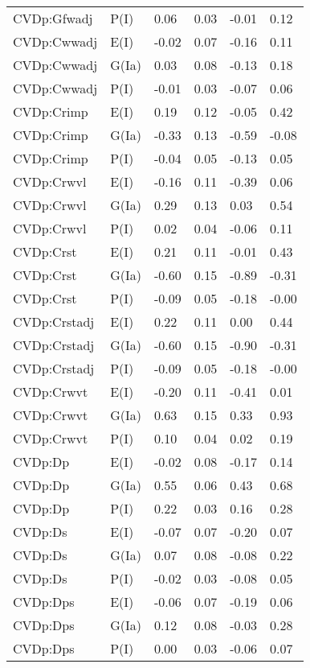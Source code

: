 \begin{center}
\begin{longtable}{|p{1.1in}|p{0.7in}|p{0.7in}|p{0.6in}|p{0.6in}|p{0.6in}|}
  CVDp:Gfwadj & P(I) & 0.06 & 0.03 & -0.01 & 0.12 \\ 
  CVDp:Cwwadj & E(I) & -0.02 & 0.07 & -0.16 & 0.11 \\ 
  CVDp:Cwwadj & G(Ia) & 0.03 & 0.08 & -0.13 & 0.18 \\ 
  CVDp:Cwwadj & P(I) & -0.01 & 0.03 & -0.07 & 0.06 \\ 
  CVDp:Crimp & E(I) & 0.19 & 0.12 & -0.05 & 0.42 \\ 
  CVDp:Crimp & G(Ia) & -0.33 & 0.13 & -0.59 & -0.08 \\ 
  CVDp:Crimp & P(I) & -0.04 & 0.05 & -0.13 & 0.05 \\ 
  CVDp:Crwvl & E(I) & -0.16 & 0.11 & -0.39 & 0.06 \\ 
  CVDp:Crwvl & G(Ia) & 0.29 & 0.13 & 0.03 & 0.54 \\ 
  CVDp:Crwvl & P(I) & 0.02 & 0.04 & -0.06 & 0.11 \\ 
  CVDp:Crst & E(I) & 0.21 & 0.11 & -0.01 & 0.43 \\ 
  CVDp:Crst & G(Ia) & -0.60 & 0.15 & -0.89 & -0.31 \\ 
  CVDp:Crst & P(I) & -0.09 & 0.05 & -0.18 & -0.00 \\ 
  CVDp:Crstadj & E(I) & 0.22 & 0.11 & 0.00 & 0.44 \\ 
  CVDp:Crstadj & G(Ia) & -0.60 & 0.15 & -0.90 & -0.31 \\ 
  CVDp:Crstadj & P(I) & -0.09 & 0.05 & -0.18 & -0.00 \\ 
  CVDp:Crwvt & E(I) & -0.20 & 0.11 & -0.41 & 0.01 \\ 
  CVDp:Crwvt & G(Ia) & 0.63 & 0.15 & 0.33 & 0.93 \\ 
  CVDp:Crwvt & P(I) & 0.10 & 0.04 & 0.02 & 0.19 \\ 
  CVDp:Dp & E(I) & -0.02 & 0.08 & -0.17 & 0.14 \\ 
  CVDp:Dp & G(Ia) & 0.55 & 0.06 & 0.43 & 0.68 \\ 
  CVDp:Dp & P(I) & 0.22 & 0.03 & 0.16 & 0.28 \\ 
  CVDp:Ds & E(I) & -0.07 & 0.07 & -0.20 & 0.07 \\ 
  CVDp:Ds & G(Ia) & 0.07 & 0.08 & -0.08 & 0.22 \\ 
  CVDp:Ds & P(I) & -0.02 & 0.03 & -0.08 & 0.05 \\ 
  CVDp:Dps & E(I) & -0.06 & 0.07 & -0.19 & 0.06 \\ 
  CVDp:Dps & G(Ia) & 0.12 & 0.08 & -0.03 & 0.28 \\ 
  CVDp:Dps & P(I) & 0.00 & 0.03 & -0.06 & 0.07 \\ 

\end{longtable}
\end{center}
